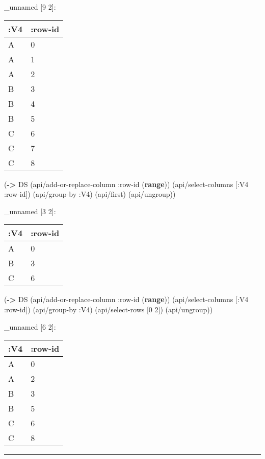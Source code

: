 \documentclass[]{article}
\newenvironment{Shaded}{\begin{snugshade}}{\end{snugshade}}
\newcommand{\AttributeTok}[1]{\textcolor[rgb]{0.77,0.63,0.00}{#1}}
\newcommand{\DecValTok}[1]{\textcolor[rgb]{0.00,0.00,0.81}{#1}}
\newcommand{\KeywordTok}[1]{\textcolor[rgb]{0.13,0.29,0.53}{\textbf{#1}}}
\newcommand{\NormalTok}[1]{#1}
\begin{document}
\_unnamed {[}9 2{]}:

\begin{longtable}[]{@{}ll@{}}
\toprule
:V4 & :row-id\tabularnewline
\midrule
\endhead
A & 0\tabularnewline
A & 1\tabularnewline
A & 2\tabularnewline
B & 3\tabularnewline
B & 4\tabularnewline
B & 5\tabularnewline
C & 6\tabularnewline
C & 7\tabularnewline
C & 8\tabularnewline
\bottomrule
\end{longtable}

\begin{Shaded}
\begin{Highlighting}[]
\NormalTok{(}\KeywordTok{->}\NormalTok{ DS}
\NormalTok{    (api/add-or-replace-column }\AttributeTok{:row-id}\NormalTok{ (}\KeywordTok{range}\NormalTok{))}
\NormalTok{    (api/select-columns [}\AttributeTok{:V4} \AttributeTok{:row-id}\NormalTok{])}
\NormalTok{    (api/group-by }\AttributeTok{:V4}\NormalTok{)}
\NormalTok{    (api/first)}
\NormalTok{    (api/ungroup))}
\end{Highlighting}
\end{Shaded}

\_unnamed {[}3 2{]}:

\begin{longtable}[]{@{}ll@{}}
\toprule
:V4 & :row-id\tabularnewline
\midrule
\endhead
A & 0\tabularnewline
B & 3\tabularnewline
C & 6\tabularnewline
\bottomrule
\end{longtable}

\begin{Shaded}
\begin{Highlighting}[]
\NormalTok{(}\KeywordTok{->}\NormalTok{ DS}
\NormalTok{    (api/add-or-replace-column }\AttributeTok{:row-id}\NormalTok{ (}\KeywordTok{range}\NormalTok{))}
\NormalTok{    (api/select-columns [}\AttributeTok{:V4} \AttributeTok{:row-id}\NormalTok{])}
\NormalTok{    (api/group-by }\AttributeTok{:V4}\NormalTok{)}
\NormalTok{    (api/select-rows [}\DecValTok{0} \DecValTok{2}\NormalTok{])}
\NormalTok{    (api/ungroup))}
\end{Highlighting}
\end{Shaded}

\_unnamed {[}6 2{]}:

\begin{longtable}[]{@{}ll@{}}
\toprule
:V4 & :row-id\tabularnewline
\midrule
\endhead
A & 0\tabularnewline
A & 2\tabularnewline
B & 3\tabularnewline
B & 5\tabularnewline
C & 6\tabularnewline
C & 8\tabularnewline
\bottomrule
\end{longtable}

\begin{center}\rule{0.5\linewidth}{0.5pt}\end{center}
\end{document}
